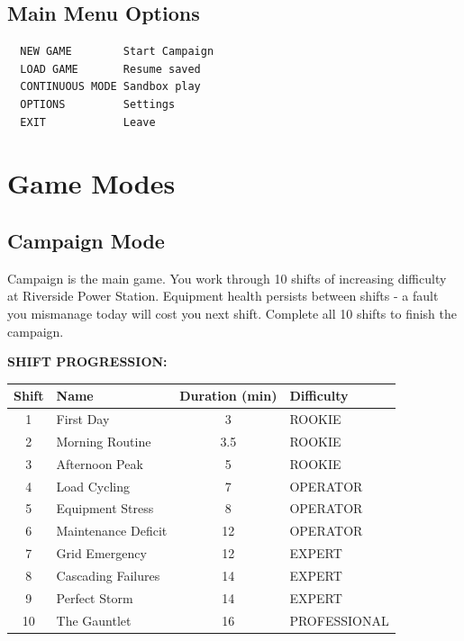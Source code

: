 \documentclass[10pt,a5paper]{article}
\begin{document}
\subsection{Main Menu Options}

\begin{Verbatim}
  NEW GAME        Start Campaign
  LOAD GAME       Resume saved
  CONTINUOUS MODE Sandbox play
  OPTIONS         Settings
  EXIT            Leave
\end{Verbatim}

\section{Game Modes}

\subsection{Campaign Mode}

Campaign is the main game. You work through 10 shifts of increasing difficulty
at Riverside Power Station. Equipment health persists between shifts - a fault
you mismanage today will cost you next shift. Complete all 10 shifts to finish
the campaign.

\textbf{\uppercase{Shift Progression:}}

\begin{center}
\begin{tabular}{clcl}
\toprule
\textbf{Shift} & \textbf{Name} & \textbf{Duration (min)} & \textbf{Difficulty} \\

\midrule
1  & First Day           & 3     & ROOKIE       \\
2  & Morning Routine     & 3.5   & ROOKIE       \\
3  & Afternoon Peak      & 5     & ROOKIE       \\
4  & Load Cycling        & 7     & OPERATOR     \\
5  & Equipment Stress    & 8     & OPERATOR     \\
6  & Maintenance Deficit & 12    & OPERATOR     \\
7  & Grid Emergency      & 12    & EXPERT       \\
8  & Cascading Failures  & 14    & EXPERT       \\
9  & Perfect Storm       & 14    & EXPERT       \\
10 & The Gauntlet        & 16    & PROFESSIONAL \\
\bottomrule
\end{tabular}
\end{center}
\end{document}

